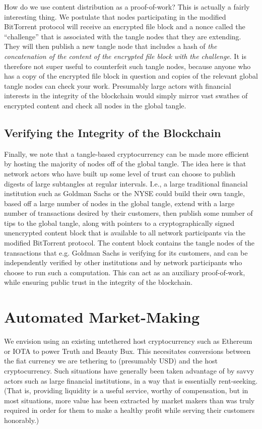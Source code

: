 \documentclass{article}
\begin{document}
How do we use content distribution as a proof-of-work? This is
actually a fairly interesting thing. We postulate that nodes
participating in the modified BitTorrent protocol will receive an
encrypted file block and a nonce called the ``challenge'' that is
associated with the tangle nodes that they are extending. They will
then publish a new tangle node that includes a hash of {\em the
  concatenation of the content of the encrypted file block with the
  challenge}. It is therefore not super useful to counterfeit such
tangle nodes, because anyone who has a copy of the encrypted file
block in question and copies of the relevant global tangle nodes can
check your work. Presumably large actors with financial interests in
the integrity of the blockchain would simply mirror vast swathes of
encrypted content and check all nodes in the global tangle.

\subsection{Verifying the Integrity of the Blockchain}

Finally, we note that a tangle-based cryptocurrency can be made more
efficient by hosting the majority of nodes off of the global
tangle. The idea here is that network actors who have built up some
level of trust can choose to publish digests of large subtangles at
regular intervals. I.e., a large traditional financial institution
such as Goldman Sachs or the NYSE could build their own tangle, based
off a large number of nodes in the global tangle, extend with a large
number of transactions desired by their customers, then publish some
number of tips to the global tangle, along with pointers to a
cryptographically signed unencrypted content block that is available
to all network participants via the modified BitTorrent protocol. The
content block contains the tangle nodes of the transactions that
e.g. Goldman Sachs is verifying for its customers, and can be
independently verified by other institutions and by network
participants who choose to run such a computation. This can act as an
auxiliary proof-of-work, while ensuring public trust in the integrity
of the blockchain.

\section{Automated Market-Making}

We envision using an existing untethered host cryptocurrency such as
Ethereum or IOTA to power Truth and Beauty Bux. This necesitates
conversions between the fiat currency we are tethering to (presumably
USD) and the host cryptocurrency. Such situations have generally been
taken advantage of by savvy actors such as large financial
institutions, in a way that is essentially rent-seeking. (That is,
providing liquidity is a useful service, worthy of compensation, but
in most situations, more value has been extracted by market makers
than was truly required in order for them to make a healthy profit
while serving their customers honorably.)
\end{document}
